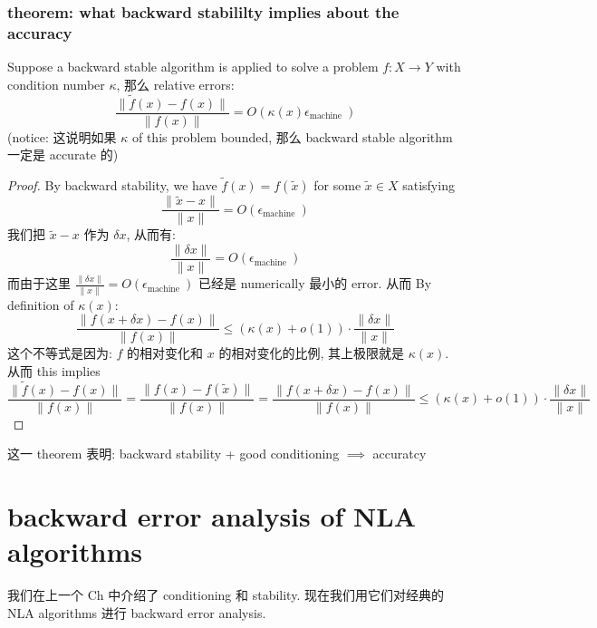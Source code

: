 \documentclass[lang=cn,11pt]{elegantbook}
\begin{document}
\subsection{theorem: what backward stabililty implies about the accuracy}
\begin{theorem} Suppose a backward stable algorithm is applied to solve a problem $f: X \rightarrow Y$ with condition number $\kappa$, 那么 relative errors:
$$
\frac{\|\tilde{f}(x)-f(x)\|}{\|f(x)\|}=O\left(\kappa(x) \epsilon_{\text {machine }}\right) 
$$
(notice: 这说明如果 $\kappa$ of this problem bounded, 那么 backward stable algorithm 一定是 accurate 的)
\end{theorem}
\begin{proof}
By backward stability, we have $\tilde{f}(x)=f(\tilde{x})$ for some $\tilde{x} \in X$ satisfying $$
\frac{\|\tilde{x}-x\|}{\|x\|}=O\left(\epsilon_{\text {machine }}\right) 
$$
我们把 $\tilde{x}-x$ 作为 $\delta x$, 从而有: $$
\frac{\|\delta x\|}{\|x\|}=O\left(\epsilon_{\text {machine }}\right)
$$
而由于这里 $\frac{\|\delta x\|}{\|x\|}=O\left(\epsilon_{\text {machine }}\right)$ 已经是 numerically 最小的 error. 从而   By definition of $\kappa(x)$: $$
\frac{\|f(x+\delta x)-f(x)\|}{\|f(x)\|} \leq (\kappa(x) + o(1)) \cdot \frac{\|\delta x\|}{\|x\|}
$$这个不等式是因为: $f$ 的相对变化和 $x$ 的相对变化的比例, 其上极限就是 $\kappa (x)$. 从而 this implies
$$
\frac{\|\tilde{f}(x)-f(x)\|}{\|f(x)\|}  = \frac{\|{f}(x)-f(\tilde{x})\|}{\|f(x)\|}  = \frac{\|f(x+\delta x)-f(x)\|}{\|f(x)\|}\leq(\kappa(x) + o(1)) \cdot \frac{\|\delta x\|}{\|x\|}
$$
\end{proof}
这一 theorem 表明: backward stability + good conditioning $\implies$ accuratcy









\chapter{backward error analysis of NLA algorithms\cite{doi:10.1137/1.9780898719574.ch3}}
我们在上一个 Ch 中介绍了 conditioning 和 stability. 现在我们用它们对经典的 NLA algorithms 进行 backward error analysis.
\end{document}
